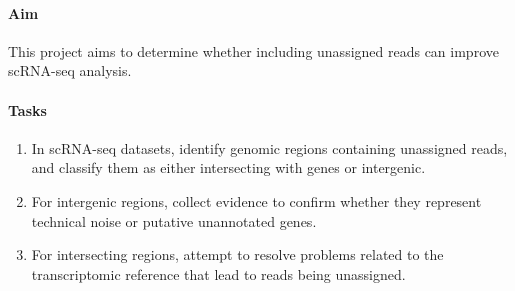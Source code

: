 \paragraph{\textbf{Aim}}

This project aims to determine whether including unassigned reads can improve scRNA-seq analysis.

\paragraph{\textbf{Tasks}}

\begin{enumerate}
  \item In scRNA-seq datasets, identify genomic regions containing unassigned reads, and classify them as either intersecting with genes or intergenic.
  \item For intergenic regions, collect evidence to confirm whether they represent technical noise or putative unannotated genes.
  \item For intersecting regions, attempt to resolve problems related to the transcriptomic reference that lead to reads being unassigned.
\end{enumerate}
